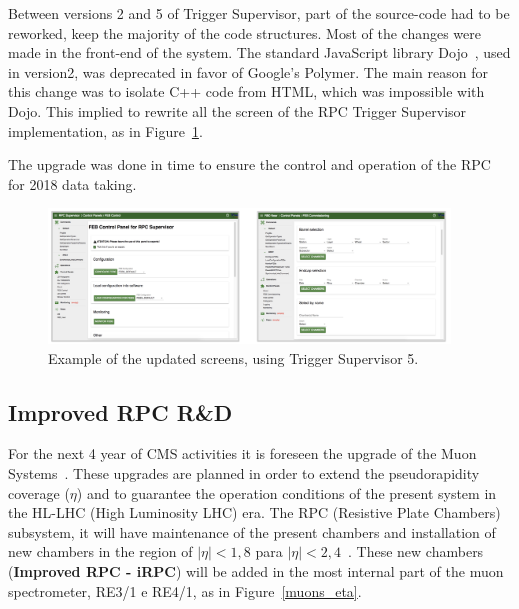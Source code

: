 Between versions 2 and 5 of Trigger Supervisor, part of the source-code had to be reworked, keep the majority of the code structures. Most of the changes were made in the front-end of the system. The standard JavaScript library Dojo~\cite{dojo}, used in version2, was deprecated in favor of Google's Polymer\cite{polymer}. The main reason for this change was to isolate C++ code from HTML, which was impossible with Dojo. This implied to rewrite all the screen of the RPC Trigger Supervisor implementation, as in Figure~\ref{ts_view}.

The upgrade  was done in time to ensure the control and operation of the RPC for 2018 data taking.

\begin{figure}[h]
\begin{center}
\includegraphics[width=0.95\textwidth,keepaspectratio]{figures_and_tables/rpc/ts_view.png}
\end{center}
\caption{Example of the updated screens, using Trigger Supervisor 5.}\label{ts_view}
\end{figure}


\subsection{Improved RPC R\&D}

For the next 4 year of CMS activities it is foreseen  the upgrade of the Muon Systems~\cite{muon_tdr}. These upgrades are planned in order to extend the pseudorapidity coverage ($\eta$) and to guarantee the operation conditions of the present system in the HL-LHC (High Luminosity LHC) era. The RPC (Resistive Plate Chambers)~\cite{muon_tdr} subsystem, it will have maintenance of the present chambers and installation of new chambers in the region of $|\eta| < 1,8$ para $|\eta| < 2,4$~\cite{pedrazamorales2018rpc}. These new chambers (\textbf{Improved RPC - iRPC}) will be added in the most internal part of the muon spectrometer, RE3/1 e RE4/1, as in Figure~\ref{muons_eta}.


